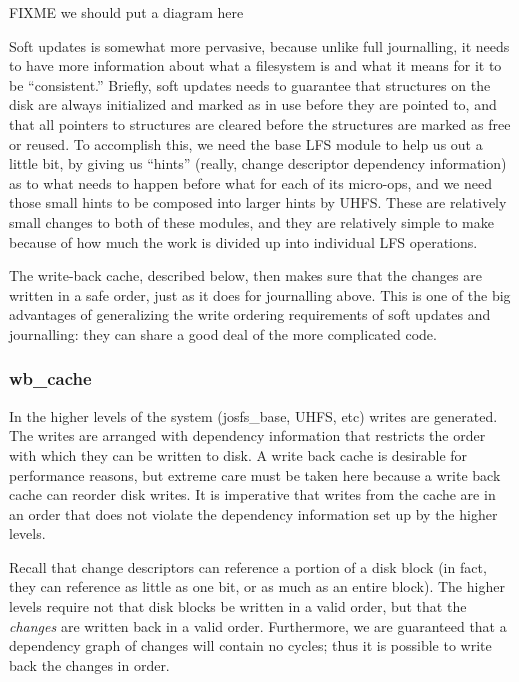 FIXME we should put a diagram here

Soft updates is somewhat more pervasive, because unlike full journalling, it
needs to have more information about what a filesystem is and what it means for
it to be ``consistent.'' Briefly, soft updates needs to guarantee that
structures on the disk are always initialized and marked as in use before they
are pointed to, and that all pointers to structures are cleared before the
structures are marked as free or reused. To accomplish this, we need the base
LFS module to help us out a little bit, by giving us ``hints'' (really, change
descriptor dependency information) as to what needs to happen before what for
each of its micro-ops, and we need those small hints to be composed into larger
hints by UHFS. These are relatively small changes to both of these modules, and
they are relatively simple to make because of how much the work is divided up
into individual LFS operations.

The write-back cache, described below, then makes sure that the changes are
written in a safe order, just as it does for journalling above. This is one of
the big advantages of generalizing the write ordering requirements of soft
updates and journalling: they can share a good deal of the more complicated
code.

\subsubsection{wb\_cache}
\label{sec:solution:impl:wbcache}

In the higher levels of the system (josfs\_base, UHFS, etc) writes are
generated. The writes are arranged with dependency information that
restricts the order with which they can be written to disk. A
write back cache is desirable for performance reasons, but extreme
care must be taken here because a write back cache can reorder disk
writes. It is imperative that writes from the cache are in an order
that does not violate the dependency information set up by the higher
levels.

Recall that change descriptors can reference a portion of a disk block
(in fact, they can reference as little as one bit, or as much as an
entire block). The higher levels require not that disk blocks be
written in a valid order, but that the \emph{changes} are written back
in a valid order. Furthermore, we are guaranteed that a dependency
graph of changes will contain no cycles; thus it is possible to write
back the changes in order.

